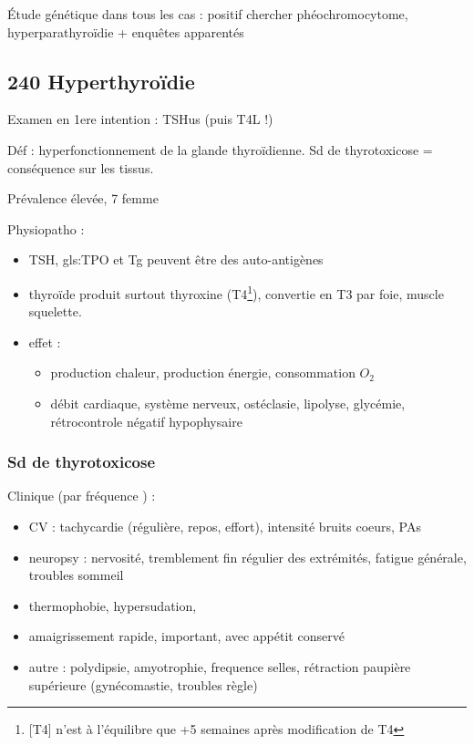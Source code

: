 \documentclass[11pt]{article}
\begin{document}
Étude génétique dans tous les cas : positif \thus chercher phéochromocytome,
hyperparathyroïdie + enquêtes apparentés
\subsection{240 \textdagger{} Hyperthyroïdie}
\label{sec:orgc0342aa}
\begin{tcolorbox}
Examen en 1ere intention : TSHus (puis T4L !)
\end{tcolorbox}

Déf : hyperfonctionnement de la glande thyroïdienne. Sd de thyrotoxicose =
conséquence sur les tissus.

Prévalence élevée, 7\texttimes{} femme

Physiopatho :
\begin{itemize}
\item TSH, gls:TPO et Tg peuvent être des auto-antigènes
\item thyroïde produit surtout thyroxine (T4\footnote{[T4] n'est à l'équilibre que +5 semaines après modification de T4}), convertie en T3 par foie, muscle
squelette.
\item effet : 
\begin{itemize}
\item \inc production chaleur, \inc production énergie, \inc consommation \(O_2\)
\item \inc débit cardiaque, système nerveux, \inc ostéclasie, \inc lipolyse, \inc
glycémie, rétrocontrole négatif hypophysaire
\end{itemize}
\end{itemize}

\subsubsection{Sd de thyrotoxicose}
\label{sec:orge91adb7}
Clinique (par fréquence \dec) :
\begin{itemize}
\item CV : tachycardie (régulière, repos, \inc effort), \inc intensité bruits
coeurs, \inc PAs
\item neuropsy : nervosité, tremblement fin régulier des extrémités, fatigue
générale, troubles sommeil
\item thermophobie, hypersudation,
\item amaigrissement rapide, important, avec appétit conservé
\item autre : polydipsie, amyotrophie, \inc frequence selles, rétraction paupière
supérieure (gynécomastie, troubles règle)
\end{itemize}
\end{document}
